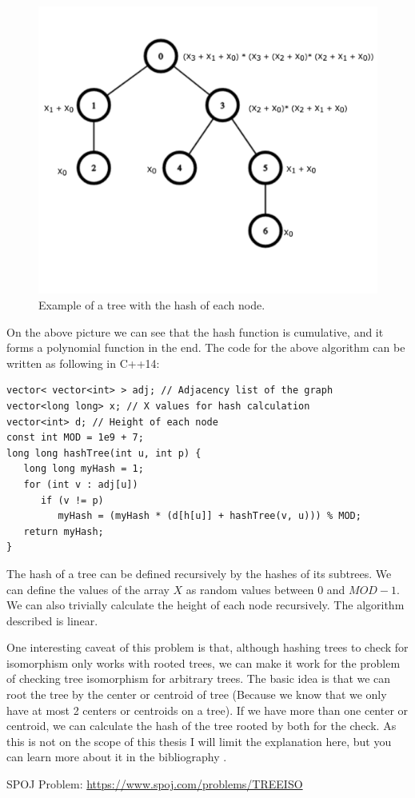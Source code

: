 \begin{figure}[h!]
  \centering
  \includegraphics[width=12.5cm]{figuras/treeIsomorphism.png}
  \caption{Example of a tree with the hash of each node. }
\end{figure}

On the above picture we can see that the hash function is cumulative, and it forms a polynomial function in the end. The code for the above algorithm can be written as following in C++14:

\begin{lstlisting}
vector< vector<int> > adj; // Adjacency list of the graph
vector<long long> x; // X values for hash calculation
vector<int> d; // Height of each node
const int MOD = 1e9 + 7;
long long hashTree(int u, int p) {
   long long myHash = 1;
   for (int v : adj[u])
      if (v != p)
         myHash = (myHash * (d[h[u]] + hashTree(v, u))) % MOD;
   return myHash;
}
\end{lstlisting}

The hash of a tree can be defined recursively by the hashes of its subtrees. We can define the values of the array \( X \) as random values between \( 0 \) and \( MOD - 1 \). We can also trivially calculate the height of each node recursively. The algorithm described is linear.

One interesting caveat of this problem is that, although hashing trees to check for isomorphism only works with rooted trees, we can make it work for the problem of checking tree isomorphism for arbitrary trees. The basic idea is that we can root the tree by the center or centroid of tree (Because we know that we only have at most 2 centers or centroids on a tree). If we have more than one center or centroid, we can calculate the hash of the tree rooted by both for the check. As this is not on the scope of this thesis I will limit the explanation here, but you can learn more about it in the bibliography \citep{Centroid}.

SPOJ Problem: \url{https://www.spoj.com/problems/TREEISO}

